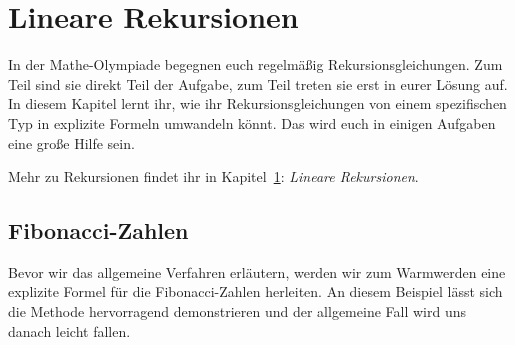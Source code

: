 \section{Lineare Rekursionen}\label{kapitel:Rekursionen}
In der Mathe-Olympiade begegnen euch regelmäßig Rekursionsgleichungen. Zum Teil sind sie direkt Teil der Aufgabe, zum Teil treten sie erst in eurer Lösung auf. In diesem Kapitel lernt ihr, wie ihr Rekursionsgleichungen von einem spezifischen Typ in explizite Formeln umwandeln könnt. Das wird euch in einigen Aufgaben eine große Hilfe sein.

Mehr zu Rekursionen findet ihr in Kapitel~\ref{kapitel:Rekursionen}: \emph{Lineare Rekursionen}.

\subsection*{Fibonacci-Zahlen}
Bevor wir das allgemeine Verfahren erläutern, werden wir zum Warmwerden eine explizite Formel für die Fibonacci-Zahlen herleiten. An diesem Beispiel lässt sich die Methode hervorragend demonstrieren und der allgemeine Fall wird uns danach leicht fallen.

